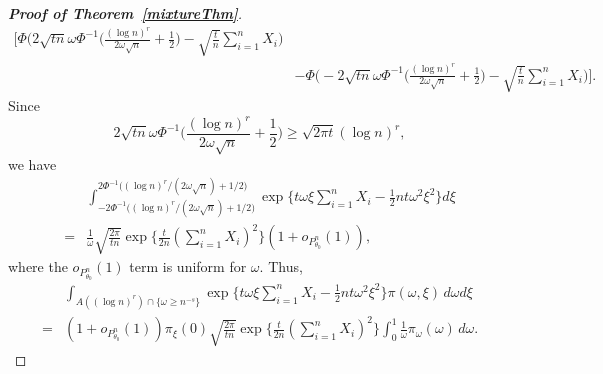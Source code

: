 \documentclass[11pt]{article}
\theoremstyle{plain}
\theoremstyle{definition}
\theoremstyle{remark}
\begin{document}
\begin{appendices}
\begin{proof}[\textbf{Proof of Theorem~\ref{mixtureThm}}]
\begin{align*}
\bigg[
    \Phi\bigg(2\sqrt{tn}\omega \Phi^{-1}\Big(\frac{(\log n)^r}{2\omega\sqrt{n}}+\frac 12\Big)-\sqrt{\frac t n} \sum_{i=1}^n X_i\bigg)
    \\
    &
    -
    \Phi\bigg(-2\sqrt{tn}\omega \Phi^{-1}\Big(\frac{(\log n)^r}{2\omega\sqrt{n}}+\frac 12\Big)-\sqrt{\frac t n} \sum_{i=1}^n X_i\bigg)
\bigg].
\end{align*}
Since
\begin{equation*}
    2\sqrt{tn}\omega \Phi^{-1}\Big(\frac{(\log n)^r}{2\omega\sqrt{n}}+\frac 12\Big)
    \geq 
    \sqrt{2\pi t} (\log n)^r,
\end{equation*}
we have
\begin{align*}
    &\int_{-2\Phi^{-1}\big((\log n)^r/(2\omega \sqrt{n})+1/2\big)}^{2\Phi^{-1}\big((\log n)^r/(2\omega \sqrt{n})+1/2\big)} \exp\big\{
        t\omega \xi \sum_{i=1}^n X_i -\frac{1}{2} nt\omega^2 \xi^2
\big\} d\xi
\\
=&
 \frac{1}{\omega}\sqrt{\frac{2\pi}{tn}}  \exp\Big\{\frac{t}{2n}(\sum_{i=1}^n X_i)^2\Big\}
(1+o_{P^n_{\theta_0}}(1)),
\end{align*}
where the $o_{P^n_{\theta_0}}(1)$ term is uniform for $\omega$.
Thus,
\begin{align*}
    &\int_{A((\log n)^r)\cap \{\omega\geq n^{-s}\} } \exp\big\{
        t\omega \xi \sum_{i=1}^n X_i -\frac{1}{2} nt\omega^2 \xi^2
    \big\} \pi(\omega,\xi)\, d\omega d\xi
    \\
=&(1+o_{P^n_{\theta_0}}(1))\pi_{\xi}(0)\sqrt{\frac{2\pi}{tn}}\exp \Big\{ \frac{t}{2n}(\sum_{i=1}^n X_i)^2\Big\} 
\int_{0}^1 
\frac{1}{\omega}
\pi_{\omega}(\omega)\, d\omega.
\end{align*}



\end{proof}
\end{appendices}
\end{document}
